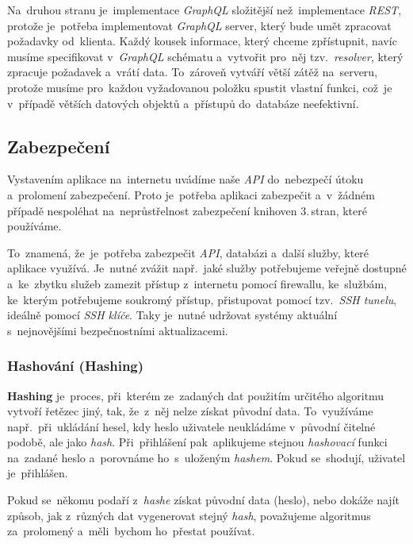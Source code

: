 \documentclass[10pt,a4paper]{article}
\begin{document}
            Na~druhou stranu je~implementace \emph{GraphQL} složitější než~implementace \emph{REST}, protože je~potřeba implementovat \emph{GraphQL} server, který bude umět zpracovat požadavky od~klienta. Každý kousek informace, který chceme zpřístupnit, navíc musíme specifikovat v~\emph{GraphQL} schématu a~vytvořit pro~něj tzv.~\emph{resolver}, který zpracuje požadavek a~vrátí data. To~zároveň vytváří větší zátěž na~serveru, protože musíme pro~každou vyžadovanou položku spustit vlastní funkci, což~je v~případě větších datových objektů a~přístupů do~databáze neefektivní.

        \subsection{Zabezpečení}
            Vystavením aplikace na~internetu uvádíme naše \emph{API} do~nebezpečí útoku a~prolomení zabezpečení. Proto je~potřeba aplikaci zabezpečit a~v~žádném případě nespoléhat na~neprůstřelnost zabezpečení knihoven 3.\,stran, které používáme.
            
            To~znamená, že~je~potřeba zabezpečit \emph{API}, databázi a~další služby, které aplikace využívá. Je~nutné zvážit např.~jaké služby potřebujeme veřejně dostupné a~ke~zbytku služeb zamezit přístup z~internetu pomocí firewallu, ke~službám, ke~kterým potřebujeme soukromý přístup, přistupovat pomocí tzv.~\emph{SSH tunelu}, ideálně pomocí \emph{SSH klíče}. Taky je~nutné udržovat systémy aktuální s~nejnovějšími bezpečnostními aktualizacemi.
            
            \subsubsection{Hashování (Hashing)}
                \textbf{Hashing} je~proces, při~kterém ze~zadaných dat použitím určitého algoritmu vytvoří řetězec jiný, tak, že~z~něj nelze získat původní data. To~využíváme např.~při~ukládání hesel, kdy heslo uživatele neukládáme v~původní čitelné podobě, ale jako \emph{hash}. Při~přihlášení pak~aplikujeme stejnou \emph{hashovací} funkci na~zadané heslo a~porovnáme ho~s~uloženým \emph{hashem}. Pokud se~shodují, uživatel je~přihlášen.
                
                Pokud se~někomu podaří z~\emph{hashe} získat původní data (heslo), nebo dokáže najít způsob, jak z~různých dat vygenerovat stejný \emph{hash}, považujeme algoritmus za~prolomený a~měli~bychom ho~přestat používat.
                
\end{document}
